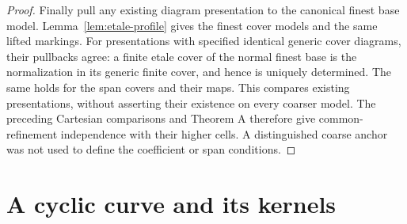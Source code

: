 \documentclass[11pt]{article}
\theoremstyle{definition}
\theoremstyle{remark}
\begin{document}
\begin{proof}
Finally pull any existing diagram presentation to the canonical
finest base model. Lemma~\ref{lem:etale-profile} gives the finest
cover models and the same lifted markings. For presentations with
specified identical generic cover diagrams, their pullbacks agree:
a finite etale cover of the normal finest base is the normalization
in its generic finite cover, and hence is uniquely determined.
The same holds for the span covers and their maps. This compares
existing presentations, without asserting their existence on every
coarser model. The preceding Cartesian comparisons and Theorem A
therefore give common-refinement independence with their higher
cells. A distinguished coarse anchor was not used to define the
coefficient or span conditions.
\end{proof}



\section{A cyclic curve and its kernels}
\label{sec:actual-loop}
\end{document}

